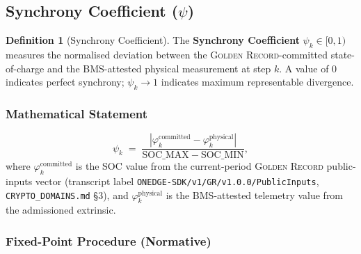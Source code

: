 \documentclass[11pt,letterpaper]{article}
\theoremstyle{definition}
\newtheorem{definition}{Definition}[section]
\newcommand{\GR}{\textsc{Golden Record}}
\newcommand{\BMS}{\textsc{BMS}}
\newcommand{\ph}{\varphi}       %
\newcommand{\sy}{\psi}          %
\begin{document}
\subsection{Synchrony Coefficient ($\sy$)}
\label{sec:psi}

\begin{definition}[Synchrony Coefficient]
\label{def:psi}
The \textbf{Synchrony Coefficient} $\sy_k \in [0, 1)$ measures the normalised deviation between the \GR-committed state-of-charge and the \BMS-attested physical measurement at step $k$. A value of $0$ indicates perfect synchrony; $\sy_k \to 1$ indicates maximum representable divergence.
\end{definition}

\subsubsection{Mathematical Statement}

\begin{equation}
    \sy_k \;=\; \frac{|\ph_k^{\mathrm{committed}} - \ph_k^{\mathrm{physical}}|}{\mathrm{SOC\_MAX} - \mathrm{SOC\_MIN}}, \label{eq:psi}
\end{equation}
where $\ph_k^{\mathrm{committed}}$ is the SOC value from the current-period \GR{} public-inputs vector (transcript label \texttt{ONEDGE-SDK/v1/GR/v1.0.0/PublicInputs}, \texttt{CRYPTO\_DOMAINS.md} §3), and $\ph_k^{\mathrm{physical}}$ is the \BMS-attested telemetry value from the admissioned extrinsic.

\subsubsection{Fixed-Point Procedure (Normative)}
\label{sec:psi_proc}
\end{document}
